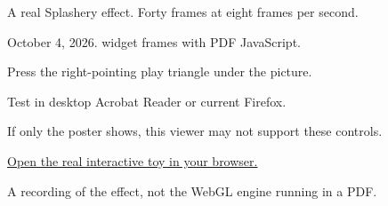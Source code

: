 \documentclass[11pt]{article}
\begin{document}
\par\medskip
\noindent A real Splashery effect. Forty frames at eight frames per second.\par
\noindent October 4, 2026. widget frames with PDF JavaScript.\par\bigskip
\begin{center}
\end{center}
\noindent Press the right-pointing play triangle under the picture.\par
\noindent Test in desktop Acrobat Reader or current Firefox.\par
\noindent If only the poster shows, this viewer may not support these controls.\par\medskip
\noindent\href{https://ryanjosephkamp.github.io/splashery/embed/?toy=grapes}{Open the real interactive toy in your browser.}\par
\vfill\noindent\small A recording of the effect, not the WebGL engine running in a PDF.
\end{document}
